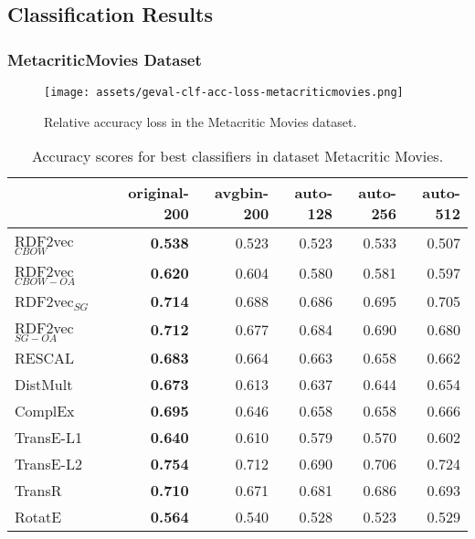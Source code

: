 \documentclass[11pt,titlepage,oneside,openany]{book}
\begin{document}
\subsection{Classification Results}
\label{subsec:geval-results-clf-dataset}

\newpage

\subsubsection{MetacriticMovies Dataset}
\label{subsubsec:geval-results-clf-metacriticmovies}

\begin{figure}[H]
    \centering
    \texttt{[image: assets/geval-clf-acc-loss-metacriticmovies.png]}
    \vspace*{-3mm}
    \caption{Relative accuracy loss in the Metacritic Movies dataset.}
    \label{fig:geval-clf-acc-loss-metacriticmovies}
\end{figure}


\begin{table}[H]
\centering
\begin{tabular}{lrrrrr}
\toprule
{} &  original-200 &  avgbin-200 &  auto-128 &  auto-256 &  auto-512 \\
\midrule
RDF2vec$_{CBOW}$     &	\textbf{0.538} &       0.523  &     0.523  &     0.533  &     0.507  \\
RDF2vec$_{CBOW-OA}$  &	\textbf{0.620} &       0.604  &     0.580  &     0.581  &     0.597  \\
RDF2vec$_{SG}$       &	\textbf{0.714} &       0.688  &     0.686  &     0.695  &     0.705  \\
RDF2vec$_{SG-OA}$    &	\textbf{0.712} &       0.677  &     0.684  &     0.690  &     0.680  \\
RESCAL               &	\textbf{0.683} &       0.664  &     0.663  &     0.658  &     0.662  \\
DistMult             &	\textbf{0.673} &       0.613  &     0.637  &     0.644  &     0.654  \\
ComplEx              &	\textbf{0.695} &       0.646  &     0.658  &     0.658  &     0.666  \\
TransE-L1            &	\textbf{0.640} &       0.610  &     0.579  &     0.570  &     0.602  \\
TransE-L2            &	\textbf{0.754} &       0.712  &     0.690  &     0.706  &     0.724  \\
TransR               &	\textbf{0.710} &       0.671  &     0.681  &     0.686  &     0.693  \\
RotatE               &	\textbf{0.564} &       0.540  &     0.528  &     0.523  &     0.529  \\
\bottomrule
\end{tabular}
\caption{Accuracy scores for best classifiers in dataset Metacritic Movies.}
\label{tab:geval-clf-acc-metacriticmovies}
\end{table}
\end{document}
